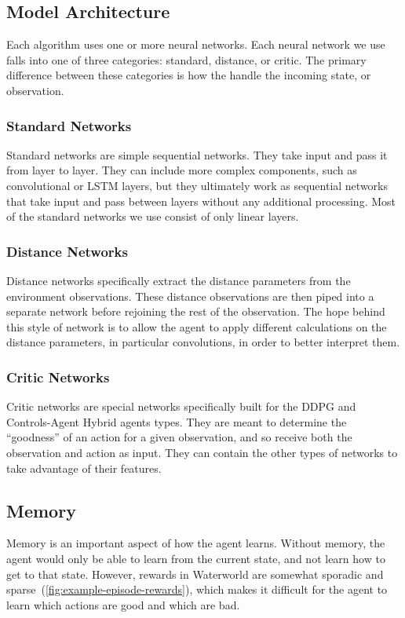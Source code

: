 \subsection{Model Architecture}\label{subsec:model-architecture}
Each algorithm uses one or more neural networks.
Each neural network we use falls into one of three categories: standard, distance, or
critic.
The primary difference between these categories is how the handle the incoming state,
or observation.

\subsubsection{Standard Networks}
Standard networks are simple sequential networks.
They take input and pass it from layer to layer.
They can include more complex components, such as convolutional or LSTM layers, but
they ultimately work as sequential networks that take input and pass between layers
without any additional processing.
Most of the standard networks we use consist of only linear layers.

\subsubsection{Distance Networks}
Distance networks specifically extract the distance parameters from the environment
observations.
These distance observations are then piped into a separate network before rejoining the
rest of the observation.
The hope behind this style of network is to allow the agent to apply different
calculations on the distance parameters, in particular convolutions, in order to better
interpret them.

\subsubsection{Critic Networks}
Critic networks are special networks specifically built for the DDPG and
Controls-Agent Hybrid agents types.
They are meant to determine the ``goodness'' of an action for a given observation,
and so receive both the observation and action as input.
They can contain the other types of networks to take advantage of their features.

\subsection{Memory}\label{subsec:memory}
Memory is an important aspect of how the agent learns.
Without memory, the agent would only be able to learn from the current state, and
not learn how to get to that state.
However, rewards in Waterworld are somewhat sporadic and
sparse~(\autoref{fig:example-episode-rewards}), which makes it difficult for the
agent to learn which actions are good and which are bad.

